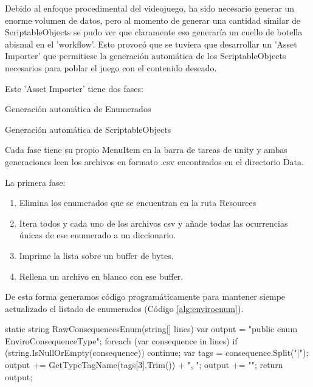 Debido al enfoque procedimental del videojuego, ha sido necesario generar un enorme volumen de datos, pero al momento de generar una cantidad similar de ScriptableObjects se pudo ver que claramente eso generaría un cuello de botella abismal en el 'workflow'. Esto provocó que se tuviera que desarrollar un 'Asset Importer' que permitiese la generación automática de los ScriptableObjects necesarios para poblar el juego con el contenido deseado.

Este 'Asset Importer' tiene dos fases:
\begin{compactitem}
    \item Generación automática de Enumerados
    \item Generación automática de ScriptableObjects
\end{compactitem}

Cada fase tiene su propio MenuItem en la barra de tareas de unity y ambas generaciones leen los archivos en formato .csv encontrados en el directorio \textunderscore Data. 

La primera fase:
\begin{enumerate}
    \item Elimina los enumerados que se encuentran en la ruta Resources
    \item Itera todos y cada uno de los archivos csv y añade todas las ocurrencias únicas de ese enumerado a un diccionario.
    \item Imprime la lista sobre un buffer de bytes.
    \item Rellena un archivo en blanco con ese buffer.
\end{enumerate} 

De esta forma generamos código programáticamente para mantener siempe actualizado el listado de enumerados (Código \ref{alg:enviroenum}).

\begin{mypython}[caption={Código para autogenerar el enumerado de EnviroConsequences.},label={alg:enviroenum}]
static string RawConsequencesEnum(string[] lines)
{
    var output = "public enum EnviroConsequenceType{";
    foreach (var consequence in lines)
    {
        if (string.IsNullOrEmpty(consequence))
        {
            continue;
        }
        var tags = consequence.Split("|");
        output += GetTypeTagName(tags[3].Trim()) + ", ";
    }
    output += "}";
    return output;
}
\end{mypython}

